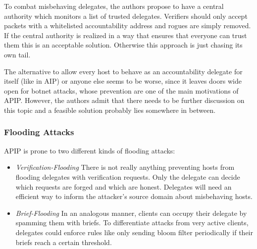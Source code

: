 \documentclass{acm_proc_article-sp}
\begin{document}
To combat misbehaving delegates, the authors propose to have a central authority which monitors a list of trusted delegates. Verifiers should only accept packets with a whitelisted accountability address and rogues are simply removed. If the central authority is realized in a way that ensures that everyone can trust them this is an acceptable solution. Otherwise this approach is just chasing its own tail.

The alternative to allow every host to behave as an accountability delegate for itself (like in AIP) or anyone else seems to be worse, since it leaves doors wide open for botnet attacks, whose prevention are one of the main motivations of APIP. However, the authors admit that there needs to be further discussion on this topic and a feasible solution probably lies somewhere in between.

\subsubsection{Flooding Attacks}
APIP is prone to two different kinds of flooding attacks:
\begin{itemize}
\item \emph{Verification-Flooding} There is not really anything preventing hosts from flooding delegates with verification requests. Only the delegate can decide which requests are forged and which are honest. Delegates will need an efficient way to inform the attacker's source domain about misbehaving hosts.
\item \emph{Brief-Flooding} In an analogous manner, clients can occupy their delegate by spamming them with briefs. To differentiate attacks from very active clients, delegates could enforce rules like only sending bloom filter periodically if their briefs reach a certain threshold.
\end{itemize}
\end{document}
